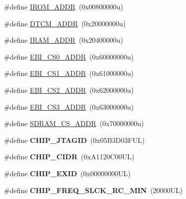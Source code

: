 \begin{DoxyCompactItemize}
\item 
\#define \mbox{\hyperlink{group__SAMS70J20__definitions_ga694212ffb8c2786bacee3d0ad6020bda}{I\+R\+O\+M\+\_\+\+A\+D\+DR}}~(0x00800000u)
\item 
\#define \mbox{\hyperlink{group__SAMS70J20__definitions_ga26626a425f7ebb3a0c2dbc276f0d9f78}{D\+T\+C\+M\+\_\+\+A\+D\+DR}}~(0x20000000u)
\item 
\#define \mbox{\hyperlink{group__SAMS70J20__definitions_gaae45ac2ef16942159481c767ac4805cf}{I\+R\+A\+M\+\_\+\+A\+D\+DR}}~(0x20400000u)
\item 
\#define \mbox{\hyperlink{group__SAMS70J20__definitions_ga9bcbb97ddae3b2cc5e2c9613d33f66b4}{E\+B\+I\+\_\+\+C\+S0\+\_\+\+A\+D\+DR}}~(0x60000000u)
\item 
\#define \mbox{\hyperlink{group__SAMS70J20__definitions_gaaddd9fdbbc77c9aced5308819f502a26}{E\+B\+I\+\_\+\+C\+S1\+\_\+\+A\+D\+DR}}~(0x61000000u)
\item 
\#define \mbox{\hyperlink{group__SAMS70J20__definitions_ga058a35f9991487dc2dd12ada792d0730}{E\+B\+I\+\_\+\+C\+S2\+\_\+\+A\+D\+DR}}~(0x62000000u)
\item 
\#define \mbox{\hyperlink{group__SAMS70J20__definitions_gad66ebdd0fc33ec3cf85dbaa14bbf05d9}{E\+B\+I\+\_\+\+C\+S3\+\_\+\+A\+D\+DR}}~(0x63000000u)
\item 
\#define \mbox{\hyperlink{group__SAMS70J20__definitions_ga61b7db25daf759c2a2beb6e5a0b57a84}{S\+D\+R\+A\+M\+\_\+\+C\+S\+\_\+\+A\+D\+DR}}~(0x70000000u)
\item 
\mbox{\label{group__SAMS70J20__definitions_gaa614519778eec0df55d3eeab3223e3f6}} 
\#define {\bfseries C\+H\+I\+P\+\_\+\+J\+T\+A\+G\+ID}~(0x05\+B3\+D03\+F\+U\+L)
\item 
\mbox{\label{group__SAMS70J20__definitions_ga1e1ae44dd9269a8a98c1d7e7a60e9fbd}} 
\#define {\bfseries C\+H\+I\+P\+\_\+\+C\+I\+DR}~(0x\+A1120\+C00\+U\+L)
\item 
\mbox{\label{group__SAMS70J20__definitions_ga35123717aa86b76bb6b73cf3adc4c2e6}} 
\#define {\bfseries C\+H\+I\+P\+\_\+\+E\+X\+ID}~(0x00000000\+U\+L)
\item 
\mbox{\label{group__SAMS70J20__definitions_ga0e868bf27426399dfdcb3a9dfc3733c4}} 
\#define {\bfseries C\+H\+I\+P\+\_\+\+F\+R\+E\+Q\+\_\+\+S\+L\+C\+K\+\_\+\+R\+C\+\_\+\+M\+IN}~(20000\+U\+L)

\end{DoxyCompactItemize}
